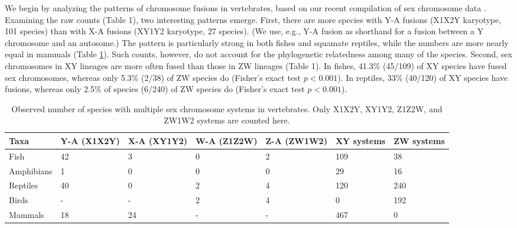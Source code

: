 We begin by analyzing the patterns of chromosome fusions in vertebrates, based on our recent compilation of sex chromosome data \citep{ToS}. Examining the raw counts (Table 1), two interesting patterns emerge. First, there are more species with Y-A fusions (X1X2Y karyotype, 101 species) than with X-A fusions (XY1Y2 karyotype, 27 species). (We use, e.g., Y-A fusion as shorthand for a fusion between a Y chromosome and an autosome.) The pattern is particularly strong in both fishes and squamate reptiles, while the numbers are more nearly equal in mammals (Table \ref{tab:fusions}). Such counts, however, do not account for the phylogenetic relatedness among many of the species. Second, sex chromosomes in XY lineages are more often fused than those in ZW lineages (Table 1). In fishes, 41.3\% (45/109) of XY species have fused sex chromosomes, whereas only 5.3\% (2/38) of ZW species do (Fisher's exact test $p < 0.001$). In reptiles, 33\% (40/120) of XY species have fusions, whereas only 2.5\% of species (6/240) of ZW species do (Fisher's exact test $p < \text{0.001}$).

\begin{table}
\centering
\begin{tabular}{|p{} |p{} |p{}|p{}|p{}|p{}|p{} |}
\hline
Taxa & Y-A (X1X2Y) & X-A (XY1Y2) & W-A (Z1Z2W) & Z-A (ZW1W2) & XY systems & ZW systems \\ \hline
Fish & 42 & 3 & 0 & 2 & 109 & 38 \\\hline
Amphibians & 1 & 0 & 0 & 0 & 29 & 16 \\\hline
Reptiles & 40 & 0 & 2 & 4 & 120 & 240 \\\hline
Birds & - & - & 2 & 4 & 0 & 192\\\hline
Mammals & 18 & 24 & - & - & 467 & 0\\\hline
\end{tabular}
\caption[Records of sex chromosome-autosome fusions in vertebrates]{Observed number of species with multiple sex chromosome systems in vertebrates. Only X1X2Y, XY1Y2, Z1Z2W, and ZW1W2 systems are counted here.}
\label{tab:fusions}
\end{table}
   

